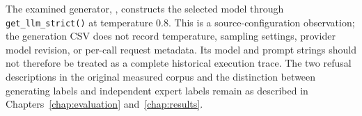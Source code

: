 The examined generator,
,
constructs the selected model through \texttt{get\_llm\_strict()} at
temperature 0.8. This is a source-configuration observation; the generation
CSV does not record temperature, sampling settings, provider model revision,
or per-call request metadata. Its model and prompt strings should not
therefore be treated as a complete historical execution trace.
The two refusal descriptions in the original measured corpus and the
distinction between generating labels and independent expert labels remain
as described in Chapters~\ref{chap:evaluation} and~\ref{chap:results}.
